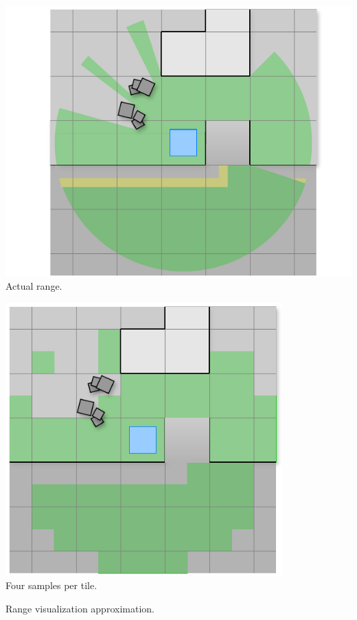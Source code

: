 \begin{center}
    \captionsetup{type=figure}
    \begin{minipage}{.5\textwidth}
        \centering
        \includegraphics[width=\textwidth]{img/Range visualisation.pdf}
        Actual range.
    \end{minipage}%
    \begin{minipage}{.5\textwidth}
        \centering
        \includegraphics[width=0.8\textwidth]{img/range visualisation low res.pdf}\\
        Four samples per tile.
    \end{minipage}
    \caption{Range visualization approximation.}
    \label{fig:low-res-range}
\end{center}

